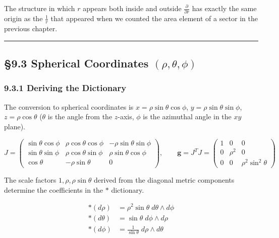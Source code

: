 The structure in which \(r\) appears both inside and outside
\(\frac{\partial}{\partial r}\) has exactly the same origin as the
\(\frac{1}{r}\) that appeared when we counted the area element of a
sector in the previous chapter.

\begin{center}\rule{0.5\linewidth}{0.5pt}\end{center}

\hypertarget{spherical-coordinates-rhothetaphi}{%
\subsection{\texorpdfstring{§9.3 Spherical Coordinates
\((\rho,\theta,\phi)\)}{§9.3 Spherical Coordinates (\textbackslash rho,\textbackslash theta,\textbackslash phi)}}\label{spherical-coordinates-rhothetaphi}}

\hypertarget{deriving-the-dictionary-1}{%
\subsubsection{9.3.1 Deriving the
Dictionary}\label{deriving-the-dictionary-1}}

The conversion to spherical coordinates is
\(x = \rho\sin\theta\cos\phi\), \(y = \rho\sin\theta\sin\phi\),
\(z = \rho\cos\theta\) (\(\theta\) is the angle from the \(z\)-axis,
\(\phi\) is the azimuthal angle in the \(xy\) plane).

\[J = \begin{pmatrix}
\sin\theta\cos\phi & \rho\cos\theta\cos\phi & -\rho\sin\theta\sin\phi \\
\sin\theta\sin\phi & \rho\cos\theta\sin\phi & \rho\sin\theta\cos\phi \\
\cos\theta & -\rho\sin\theta & 0
\end{pmatrix},\qquad
\mathbf{g} = J^T J = \begin{pmatrix}
1 & 0 & 0 \\
0 & \rho^2 & 0 \\
0 & 0 & \rho^2\sin^2\theta
\end{pmatrix}\]

The scale factors \(1, \rho, \rho\sin\theta\) derived from the diagonal
metric components determine the coefficients in the \(\ast\) dictionary.

\[\begin{aligned}
\ast(d\rho) &= \rho^2\sin\theta\; d\theta \wedge d\phi \\
\ast(d\theta) &= \sin\theta\; d\phi \wedge d\rho \\
\ast(d\phi) &= \frac{1}{\sin\theta}\; d\rho \wedge d\theta
\end{aligned}\]

